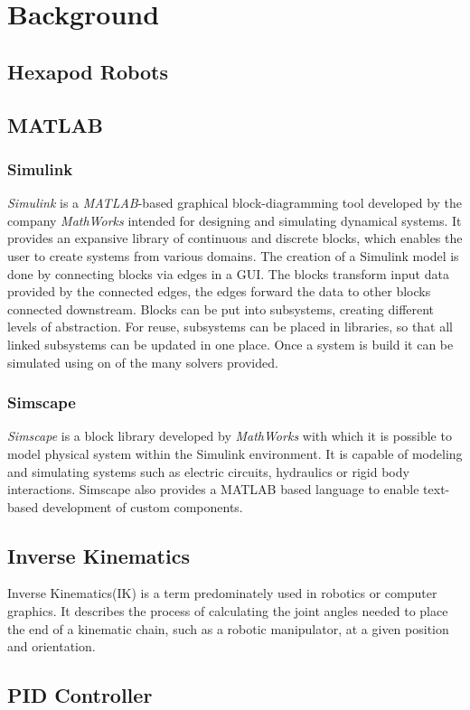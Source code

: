 \chapter{Background}
\label{ch:background}


\section{Hexapod Robots}

\section{MATLAB}
\subsection{Simulink}
\textit{Simulink\textsuperscript{\textregistered}} is a \textit{MATLAB\textsuperscript{\textregistered}}-based graphical block-diagramming tool developed by the company \textit{MathWorks\textsuperscript{\textregistered}} intended for designing and simulating dynamical systems.
It provides an expansive library of continuous and discrete blocks, which enables the user to create systems from various domains.
The creation of a Simulink model is done by connecting blocks via edges in a GUI.
The blocks transform input data provided by the connected edges, the edges forward the data to other blocks connected downstream.
Blocks can be put into subsystems, creating different levels of abstraction.
For reuse, subsystems can be placed in libraries, so that all linked subsystems can be updated in one place.
Once a system is build it can be simulated using on of the many solvers provided.

\subsection{Simscape}
\textit{Simscape\textsuperscript{\texttrademark}} is a block library developed by \textit{MathWorks\textsuperscript{\textregistered}} with which it is possible to model physical system within the Simulink environment.
It is capable of modeling and simulating systems such as electric circuits, hydraulics or rigid body interactions.
Simscape also provides a MATLAB based language to enable text-based development of custom components.
 



\section{Inverse Kinematics}
Inverse Kinematics(IK) is a term predominately used in robotics or computer graphics.
It describes the process of calculating the joint angles needed to place the end of a kinematic chain, such as a robotic manipulator, at a given position and orientation.





\section{PID Controller}